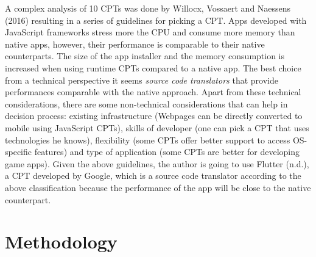 \documentclass[version=last,fontsize=13pt]{scrartcl}
\begin{document}
	\indent
	A complex analysis of 10  CPTs was done by Willocx, Vossaert and Naessens (2016) resulting in a series of guidelines for picking a CPT. Apps developed with JavaScript frameworks stress more the CPU and consume more memory than native apps, however, their performance is comparable to their native counterparts. The size of the app installer and the memory consumption is increased when using runtime CPTs compared to a native app. The best choice from a technical perspective it seems \textit{source code translators} that provide performances comparable with the native approach. Apart from these technical considerations, there are some non-technical considerations that can help in decision process: existing infrastructure (Webpages can be directly converted to mobile using JavaScript CPTs), skills of developer (one can pick a CPT that uses technologies he knows), flexibility (some CPTs offer better support to access OS-specific features) and type of application (some CPTs are better for developing game apps). Given the above guidelines, the author is going to use Flutter (n.d.), a CPT developed by Google, which is a source code translator according to the above classification because the performance of the app will be close to the native counterpart.

\section{Methodology}%


\end{document}
